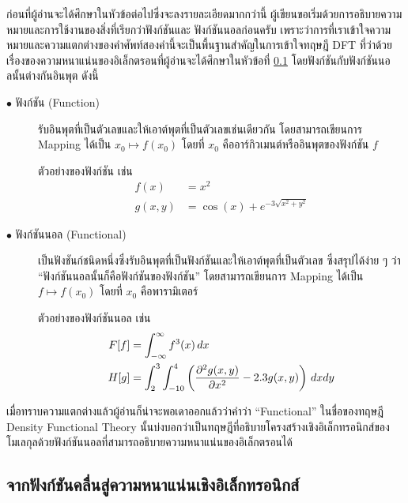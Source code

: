 ก่อนที่ผู้อ่านจะได้ศึกษาในหัวข้อต่อไปซึ่งจะลงรายละเอียดมากกว่านี้ ผู้เขียนขอเริ่มด้วยการอธิบายความหมายและการใช้งานของสิ่งที่เรียกว่าฟังก์ชันและ%
ฟังก์ชันนอลก่อนครับ เพราะว่าการที่เราเข้าใจความหมายและความแตกต่างของคำศัพท์สองคำนี้จะเป็นพื้นฐานสำคัญในการเข้าใจทฤษฎี DFT ที่ว่าด้วย%
เรื่องของความหนาแน่นของอิเล็กตรอนที่ผู้อ่านจะได้ศึกษาในหัวข้อที่ \ref{ssec:elec_density} โดยฟังก์ชันกับฟังก์ชันนอลนั้นต่างกันอินพุต ดังนี้

\begin{description}
    \item[$\bullet$ ฟังก์ชัน (Function)] รับอินพุตที่เป็นตัวเลขและให้เอาต์พุตที่เป็นตัวเลขเช่นเดียวกัน โดยสามารถเขียนการ Mapping 
    ได้เป็น $x_0 \mapsto f(x_0)$ โดยที่ $x_{0}$ คืออาร์กิวเมนต์หรืออินพุตของฟังก์ชัน $f$ 
    
    ตัวอย่างของฟังก์ชัน เช่น
    \begin{align*}
        f(x) &= x^{2} \\
        g(x,y) &= \cos(x) + e^{-3\sqrt{x^{2} + y^{2}}}
    \end{align*}

    \item[$\bullet$ ฟังก์ชันนอล (Functional)] เป็นฟังชันก์ชนิดหนึ่งซึ่งรับอินพุตที่เป็นฟังก์ชันและให้เอาต์พุตที่เป็นตัวเลข ซึ่งสรุปได้ง่าย ๆ 
    ว่า \enquote{ฟังก์ชันนอลนั้นก็คือฟังก์ชันของฟังก์ชัน} โดยสามารถเขียนการ Mapping ได้เป็น $f \mapsto f(x_0)$ โดยที่ $x_{0}$ 
    คือพารามิเตอร์ 
    
    ตัวอย่างของฟังก์ชันนอล เช่น 
    \begin{align*}
        F[f] &= \int^{\infty}_{-\infty} f^{3}(x) \, dx \\
        H[g] &= \int^{3}_{2} \int^{4}_{-10} \left ( \pdv[2]{g(x,y)}{x} - 2.3 g(x,y) \right ) \, dx dy
    \end{align*}
\end{description}

เมื่อทราบความแตกต่างแล้วผู้อ่านก็น่าจะพอเดาออกแล้วว่าคำว่า \enquote{Functional} ในชื่อของทฤษฎี Density Functional Theory 
นั้นบ่งบอกว่าเป็นทฤษฎีที่อธิบายโครงสร้างเชิงอิเล็กทรอนิกส์ของโมเลกุลด้วยฟังก์ชันนอลที่สามารถอธิบายความหนาแน่นของอิเล็กตรอนได้

\subsection{จากฟังก์ชันคลื่นสู่ความหนาแน่นเชิงอิเล็กทรอนิกส์}
\label{ssec:elec_density}

